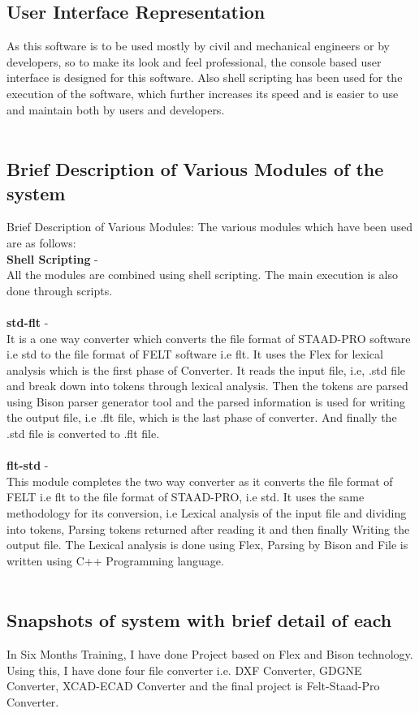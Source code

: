 \subsection{User Interface Representation} 
As this software is to be used mostly by civil and mechanical engineers or by developers, so to make its look and feel professional, the console based user interface is designed for this software. Also shell scripting has been used for the execution of the software, which further increases its speed and is easier to use and maintain both by users and developers.\\\\
\subsection {Brief Description of Various Modules of the system}
Brief Description of Various Modules:
The various modules which have been used are as follows:\\
\textbf{Shell Scripting} -\\ 
All the modules are combined using shell scripting. The main execution is also done through scripts.\\\\
\textbf{std-flt} -\\ 
It is a one way converter which converts the file format of STAAD-PRO software i.e std to the file format of FELT software i.e flt. It uses the Flex for lexical analysis which is the first phase of Converter. It reads the input file, i.e, .std file and break down into tokens through lexical analysis. Then the tokens are parsed using Bison parser generator tool and the parsed information is used for writing the output file, i.e .flt file, which is the last phase of converter. And finally the .std file is converted to .flt file.\\\\
\textbf{flt-std} -\\
 This module completes the two way converter as it converts the file format of FELT i.e flt to the file format of STAAD-PRO, i.e std. It uses the same methodology for its conversion, i.e Lexical analysis of the input file and dividing into tokens, Parsing tokens returned after reading it and then finally Writing the output file. The Lexical analysis is done using Flex, Parsing by Bison and File is written using C++ Programming language.\\\\


\subsection{Snapshots of system with brief detail of each}
In Six Months Training, I have done Project based on Flex and Bison technology. Using this, I have done four file converter i.e. DXF Converter, GDGNE Converter, XCAD-ECAD Converter and the final project is Felt-Staad-Pro Converter.\\\\

